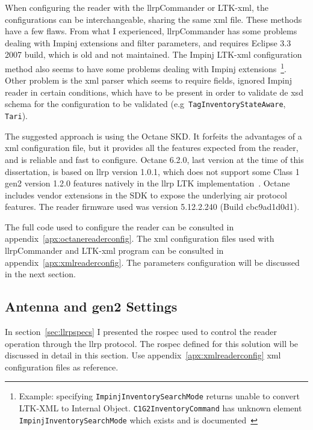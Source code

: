 When configuring the reader with the \acs{llrp}Commander or LTK-\ac{xml}, the configurations can be interchangeable, sharing the same \ac{xml} file. These methods have a few flaws. From what I experienced, \ac{llrp}Commander has some problems dealing with Impinj extensions and filter parameters, and requires Eclipse $3.3$ 2007 build, which is old and not maintained.
The Impinj LTK-\ac{xml} configuration method also seems to have some problems dealing with Impinj extensions~\footnote{Example: specifying \texttt{ImpinjInventorySearchMode} returns unable to convert LTK-XML to Internal Object. \texttt{C1G2InventoryCommand} has unknown element \texttt{ImpinjInventorySearchMode} which exists and is documented~\cite{ImpinjLTKProgrammers}}.
Other problem is the \ac{xml} parser which seems to require fields, ignored Impinj reader in certain conditions, which have to be present in order to validate de \ac{xsd} schema for the configuration to be validated (e.g\ \texttt{TagInventoryStateAware}, \texttt{Tari}).

The suggested approach is using the Octane SKD. It forfeits the advantages of a \ac{xml} configuration file, but it provides all the features expected from the reader, and is reliable and fast to configure.
Octane 6.2.0, last version at the time of this dissertation, is based on \ac{llrp} version 1.0.1, which does not support some Class 1 \ac{gen2} version 1.2.0 features natively in the \ac{llrp} LTK implementation~\cite{ImpinjOctaneLLRP}. Octane includes vendor extensions in the SDK to expose the underlying air protocol features.
The reader firmware used was version 5.12.2.240 (Build cbc9ad1d0d1).

The full code used to configure the reader can be consulted in appendix~\ref{apx:octanereaderconfig}.
The \ac{xml} configuration files used with \ac{llrp}Commander and LTK-\acs{xml} program can be consulted in appendix~\ref{apx:xmlreaderconfig}.
The parameters configuration will be discussed in the next section.

\subsection{Antenna and \acs{gen2} Settings}

In section~\ref{sec:llrpspecs} I presented the \ac{rospec} used to control the reader operation through the \ac{llrp} protocol. The \ac{rospec} defined for this solution will be discussed in detail in this section.
Use appendix~\ref{apx:xmlreaderconfig} \ac{xml} configuration files as reference.

